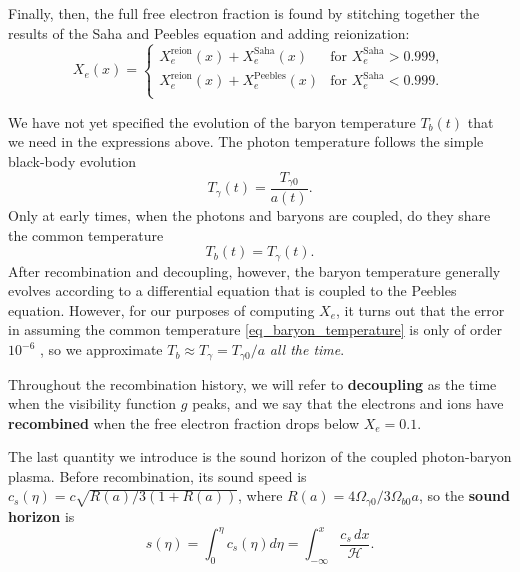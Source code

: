 \documentclass[10pt,a4paper]{article}
\begin{document}
Finally, then, the full free electron fraction is found by stitching together the results of the Saha and Peebles equation and adding reionization:
\begin{equation}
	X_e(x) = \begin{cases}
	             X_e^\text{reion}(x) + X_e^\text{Saha}(x) & \text{for $X_e^\text{Saha} > 0.999$}, \\
	             X_e^\text{reion}(x) + X_e^\text{Peebles}(x) & \text{for $X_e^\text{Saha} < 0.999$}. \\
	         \end{cases}
\label{eq_free_electron_fraction}
\end{equation}

We have not yet specified the evolution of the baryon temperature $T_b(t)$ that we need in the expressions above.
The photon temperature follows the simple black-body evolution
\begin{equation}
	T_\gamma(t) = \frac{T_{\gamma 0}}{a(t)}.
\label{eq_photon_temperature}
\end{equation}
Only at early times, when the photons and baryons are coupled, do they share the common temperature
\begin{equation}
	T_b(t) = T_{\gamma}(t).
\label{eq_baryon_temperature}
\end{equation}
After recombination and decoupling, however,
the baryon temperature generally evolves according to a differential equation that is coupled to the Peebles equation.
However, for our purposes of computing $X_e$,
it turns out that the error in assuming the common temperature \eqref{eq_baryon_temperature} is only of order $10^{-6}$ \cite[page 16]{keskitaloEffectMatterBaryon2005},
so we approximate $T_b \approx T_\gamma = T_{\gamma 0} / a$ \emph{all the time}.

Throughout the recombination history, we will refer to
\textbf{decoupling} as the time when the visibility function $g$ peaks,
and we say that the electrons and ions have \textbf{recombined} when the free electron fraction drops below $X_e = 0.1$.

The last quantity we introduce is the sound horizon
of the coupled photon-baryon plasma.
Before recombination, its sound speed is
$c_s(\eta) = c \sqrt{R(a) / 3(1+R(a))}$,
where $R(a) = 4 \Omega_{\gamma 0} / 3 \Omega_{b 0} a$,
so the \textbf{sound horizon} is
\begin{equation}
	s(\eta) = \int_0^\eta c_s(\eta) d\eta = \int_{-\infty}^x \frac{c_s \, dx}{\mathcal{H}}.
\label{eq_sound_horizon}
\end{equation}
\end{document}
